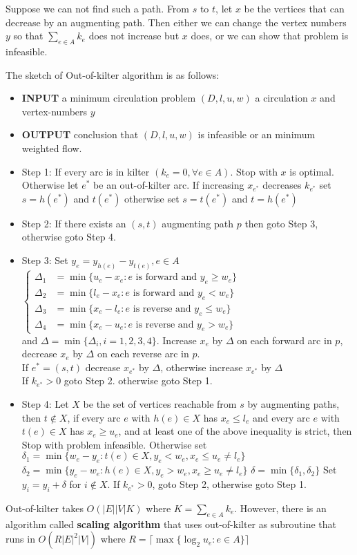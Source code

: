             Suppose we can not find such a path. From $s$ to $t$, let $x$ be the vertices that can decrease by an augmenting path. Then either we can change the vertex numbers $y$ so that $\sum_{e\in A} k_e$ does not increase but $x$ does, or we can show that problem is infeasible.

            The sketch of Out-of-kilter algorithm is as follows:
            \begin{itemize}
                \item \textbf{INPUT} a minimum circulation problem $(D, l, u, w)$ a circulation $x$ and vertex-numbers $y$
                \item \textbf{OUTPUT} conclusion that $(D, l, u, w)$ is infeasible or an minimum weighted flow.
                \item Step 1: If every arc is in kilter $(k_e = 0, \forall e\in A)$. Stop with $x$ is optimal. Otherwise let $e^*$ be an out-of-kilter arc. If increasing $x_{e^*}$ decreases $k_{e^*}$ set $s=h(e^*)$ and $t(e^*)$ otherwise set $s=t(e^*)$ and $t=h(e^*)$
                \item Step 2: If there exists an $(s, t)$ augmenting path $p$ then goto Step 3, otherwise goto Step 4.
                \item Step 3: Set $y_e = y_{h(e)} - y_{t(e)}, e\in A$
                $\begin{cases}
                    \Delta_1 &= \min\{u_e - x_e: e \text{ is forward and } y_e \ge w_e\}\\
                    \Delta_2 &= \min\{l_e - x_e: e \text{ is forward and } y_e < w_e\}\\
                    \Delta_3 &= \min\{x_e - l_e: e \text{ is reverse and } y_e \le w_e\}\\
                    \Delta_4 &= \min\{x_e - u_e: e \text{ is reverse and } y_e > w_e\}
                \end{cases}$\\
                and $\Delta = \min\{\Delta_i, i = 1, 2, 3, 4\}$. Increase $x_e$ by $\Delta$ on each forward arc in $p$, decrease $x_e$ by $\Delta$ on each reverse arc in $p$.\\
                If $e^* = (s, t)$ decrease $x_{e^*}$ by $\Delta$, otherwise increase $x_{e^*}$ by $\Delta$\\
                If $k_{e^*} > 0$ goto Step 2. otherwise goto Step 1.
                \item Step 4: Let $X$ be the set of vertices reachable from $s$ by augmenting paths, then $t \notin X$, if every arc $e$ with $h(e) \in X$ has $x_e \le l_e$ and every arc $e$ with $t(e) \in X$ has $x_e \ge u_e$, and at least one of the above inequality is strict, then Stop with problem infeasible. Otherwise set
                    $\delta_1 = \min\{w_e - y_e: t(e) \in X, y_e < w_e, x_e \le u_e \neq l_e\}$
                    $\delta_2 = \min\{y_e - w_e: h(e) \in X, y_e > w_e, x_e \ge u_e \neq l_e\}$
                    $\delta = \min\{\delta_1, \delta_2\}$
                Set $y_i = y_i + \delta$ for $i \notin X$. If $k_{e^*} > 0$, goto Step 2, otherwise goto Step 1.
            \end{itemize}                

            Out-of-kilter takes $O(|E||V|K)$ where $K = \sum_{e\in A} k_e$. However, there is an algorithm called \textbf{scaling algorithm} that uses out-of-kilter as subroutine that runs in $O(R|E|^2|V|)$ where $R = \lceil \max\{\log_2 u_e: e\in A\}\rceil$
